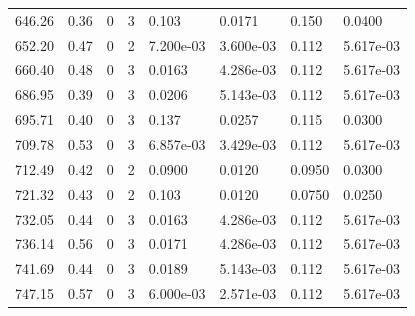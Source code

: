 \documentclass[preview]{standalone}
\begin{document}
{{{\begin{tabular}{L{1.2cm}C{1.2cm} C{0.3cm}C{0.5cm} C{1.4cm}C{1.4cm} C{1.4cm}C{1.4cm}}
  646.26  &  0.36  & 0     &  3 &  0.103  & 0.0171  & 0.150 &  0.0400   \\ 
  652.20  &  0.47  & 0     &  2 &  7.200e-03  & 3.600e-03  & 0.112 &  5.617e-03   \\ 
  660.40  &  0.48  & 0     &  3 &  0.0163  & 4.286e-03  & 0.112 &  5.617e-03   \\ 
  686.95  &  0.39  & 0     &  3 &  0.0206  & 5.143e-03  & 0.112 &  5.617e-03   \\ 
  695.71  &  0.40  & 0     &  3 &  0.137  & 0.0257  & 0.115 &  0.0300   \\ 
  709.78  &  0.53  & 0     &  3 &  6.857e-03  & 3.429e-03  & 0.112 &  5.617e-03   \\ 
  712.49  &  0.42  & 0     &  2 &  0.0900  & 0.0120  & 0.0950 &  0.0300   \\ 
  721.32  &  0.43  & 0     &  2 &  0.103  & 0.0120  & 0.0750 &  0.0250   \\ 
  732.05  &  0.44  & 0     &  3 &  0.0163  & 4.286e-03  & 0.112 &  5.617e-03   \\ 
  736.14  &  0.56  & 0     &  3 &  0.0171  & 4.286e-03  & 0.112 &  5.617e-03   \\ 
  741.69  &  0.44  & 0     &  3 &  0.0189  & 5.143e-03  & 0.112 &  5.617e-03   \\ 
  747.15  &  0.57  & 0     &  3 &  6.000e-03  & 2.571e-03  & 0.112 &  5.617e-03   \\ 
\hline 
\end{tabular} 

}}}
\end{document}
